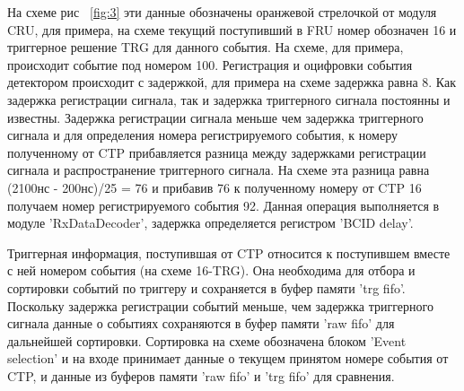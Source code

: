 \documentclass{article}
\begin{document}
На схеме рис ~\ref{fig:3} эти данные обозначены оранжевой стрелочкой от модуля CRU, для примера, на схеме текущий поступивший в FRU номер обозначен 16 и триггерное решение TRG для данного события. На схеме, для примера, происходит событие под номером 100. Регистрация и оцифровки события детектором происходит с задержкой, для примера на схеме задержка равна 8. Как задержка регистрации сигнала, так и задержка триггерного сигнала постоянны и известны. Задержка регистрации сигнала меньше чем задержка триггерного сигнала и для определения номера регистрируемого события, к номеру полученному от CTP прибавляется разница между задержками регистрации сигнала и распространение триггерного сигнала. На схеме эта разница равна (2100нс - 200нс)/25 = 76 и прибавив 76 к полученному номеру от CTP 16 получаем номер регистрируемого события 92. Данная операция выполняется в модуле 'RxDataDecoder', задержка определяется регистром 'BCID delay'. 

Триггерная информация, поступившая от CTP относится к поступившем вместе с ней номером события (на схеме 16-TRG). Она необходима для отбора и сортировки событий по триггеру и сохраняется в буфер памяти 'trg fifo'. Поскольку задержка регистрации событий меньше, чем задержка триггерного сигнала данные о событиях сохраняются в буфер памяти 'raw fifo' для дальнейшей сортировки. Сортировка на схеме обозначена блоком 'Event selection' и на входе принимает данные о текущем принятом номере события от CTP, и данные из буферов памяти 'raw fifo' и 'trg fifo' для сравнения.
\end{document}
